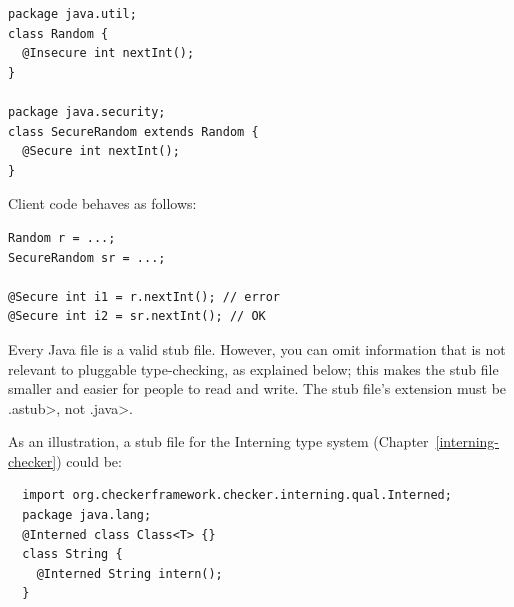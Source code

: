 \begin{Verbatim}
package java.util;
class Random {
  @Insecure int nextInt();
}

package java.security;
class SecureRandom extends Random {
  @Secure int nextInt();
}
\end{Verbatim}

Client code behaves as follows:

\begin{Verbatim}
Random r = ...;
SecureRandom sr = ...;

@Secure int i1 = r.nextInt(); // error
@Secure int i2 = sr.nextInt(); // OK
\end{Verbatim}



Every Java file is a valid stub file.  However, you can omit information
that is not relevant to pluggable type-checking, as explained below;
this makes the stub file
smaller and easier for people to read and write.
The stub file's extension must be \<.astub>, not \<.java>.

As an illustration, a stub file for the Interning type system
(Chapter~\ref{interning-checker}) could be:

\begin{Verbatim}
  import org.checkerframework.checker.interning.qual.Interned;
  package java.lang;
  @Interned class Class<T> {}
  class String {
    @Interned String intern();
  }
\end{Verbatim}

